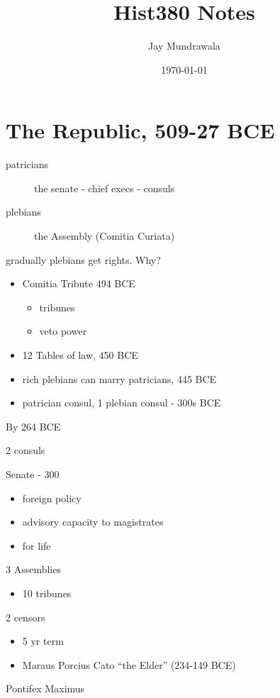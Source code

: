 \documentclass[11pt, a4paper]{article}
\begin{document}
\title{Hist380 Notes}
\author{Jay Mundrawala}
\date{\today}
\maketitle

\section{The Republic, 509-27 BCE}
\begin{description}
  \item[patricians] the senate - chief execs - consuls
  \item[plebians] the Assembly (Comitia Curiata)
\end{description}

gradually plebians get rights. Why?
\begin{itemize}
  \item Comitia Tribute 494 BCE
    \begin{itemize}
      \item tribunes
      \item veto power
    \end{itemize}
  \item 12 Tables of law, 450 BCE
  \item rich plebians can marry patricians, 445 BCE
  \item patrician consul, 1 plebian consul - 300s BCE
\end{itemize}

By 264 BCE

2 consuls

Senate - 300
\begin{itemize}
  \item foreign policy
  \item advisory capacity to magistrates
  \item for life
\end{itemize}

3 Assemblies
\begin{itemize}
  \item 10 tribunes
\end{itemize}

2 censors
\begin{itemize}
  \item 5 yr term
  \item Maraus Porcius Cato ``the Elder'' (234-149 BCE)
\end{itemize}

Pontifex Maximus
\end{document}
